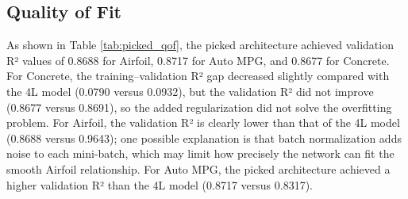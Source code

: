 \documentclass{article}
\begin{document}
\subsection{Quality of Fit}
\begin{table}[H]
    \centering
    \caption{Picked Architecture Quality of Fit Results}
    \label{tab:picked_qof}
    \small
\end{table}

As shown in Table \ref{tab:picked_qof}, the picked architecture achieved validation R² values of 0.8688 for Airfoil, 0.8717 for Auto MPG, and 0.8677 for Concrete. For Concrete, the training--validation R² gap decreased slightly compared with the 4L model (0.0790 versus 0.0932), but the validation R² did not improve (0.8677 versus 0.8691), so the added regularization did not solve the overfitting problem. For Airfoil, the validation R² is clearly lower than that of the 4L model (0.8688 versus 0.9643); one possible explanation is that batch normalization adds noise to each mini-batch, which may limit how precisely the network can fit the smooth Airfoil relationship. For Auto MPG, the picked architecture achieved a higher validation R² than the 4L model (0.8717 versus 0.8317).
\medskip
\end{document}
